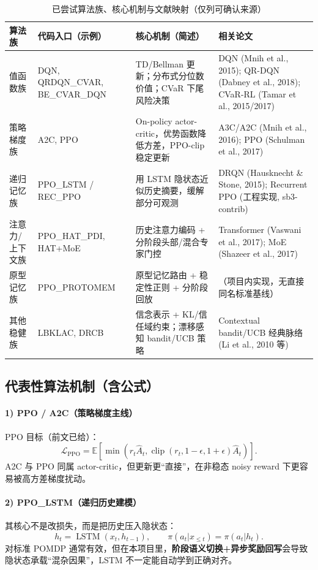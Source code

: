 ﻿\documentclass[11pt,a4paper]{ctexart}
\begin{document}
\begin{table}[H]
\centering
\caption{已尝试算法族、核心机制与文献映射（仅列可确认来源）}
\begin{tabular}{p{3.1cm}p{3.9cm}p{4.6cm}p{3.3cm}}
\toprule
算法族 & 代码入口（示例） & 核心机制（简述） & 相关论文 \\
\midrule
值函数族 & DQN, QRDQN\_CVAR, BE\_CVAR\_DQN & TD/Bellman 更新；分布式分位数价值；CVaR 下尾风险决策 & DQN (Mnih et al., 2015); QR-DQN (Dabney et al., 2018); CVaR-RL (Tamar et al., 2015/2017) \\
策略梯度族 & A2C, PPO & On-policy actor-critic，优势函数降低方差，PPO-clip 稳定更新 & A3C/A2C (Mnih et al., 2016); PPO (Schulman et al., 2017) \\
递归记忆族 & PPO\_LSTM / REC\_PPO & 用 LSTM 隐状态近似历史摘要，缓解部分可观测 & DRQN (Hausknecht \& Stone, 2015); Recurrent PPO (工程实现, sb3-contrib) \\
注意力/上下文族 & PPO\_HAT\_PDI, HAT+MoE & 历史注意力编码 + 分阶段头部/混合专家门控 & Transformer (Vaswani et al., 2017); MoE (Shazeer et al., 2017) \\
原型记忆族 & PPO\_PROTOMEM & 原型记忆路由 + 稳定性正则 + 分阶段回放 & （项目内实现，无直接同名标准基线） \\
其他稳健族 & LBKLAC, DRCB & 信念表示 + KL/信任域约束；漂移感知 bandit/UCB 策略 & Contextual bandit/UCB 经典脉络 (Li et al., 2010 等) \\
\bottomrule
\end{tabular}
\end{table}

\subsection{代表性算法机制（含公式）}
\paragraph{1) PPO / A2C（策略梯度主线）}
PPO 目标（前文已给）：
\begin{equation}
\mathcal{L}_{\text{PPO}}=
\mathbb{E}\left[
\min(r_t\hat A_t,\operatorname{clip}(r_t,1-\epsilon,1+\epsilon)\hat A_t)
\right].
\end{equation}
A2C 与 PPO 同属 actor-critic，但更新更“直接”，在非稳态 noisy reward 下更容易被高方差梯度扰动。

\paragraph{2) PPO\_LSTM（递归历史建模）}
其核心不是改损失，而是把历史压入隐状态：
\begin{equation}
h_t=\operatorname{LSTM}(x_t,h_{t-1}),\qquad
\pi(a_t|x_{\le t})=\pi(a_t|h_t).
\end{equation}
对标准 POMDP 通常有效，但在本项目里，\textbf{阶段语义切换+异步奖励回写}会导致隐状态承载“混杂因果”，LSTM 不一定能自动学到正确对齐。
\end{document}
